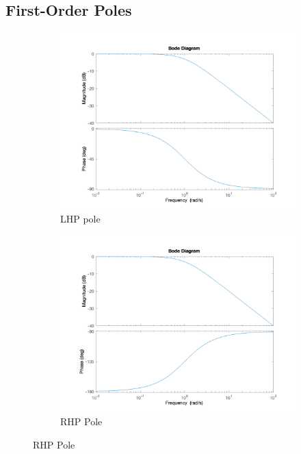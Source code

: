 \subsection*{First-Order Poles}
\begin{figure}[!h]
  \centering
  \begin{subfigure}[b]{0.45\textwidth}	
	\includegraphics[width=\textwidth]{Images/bode_lhp_pole}
	\caption{LHP pole}
	\label{fig:bode-lhp-pole}
  \end{subfigure}
  \begin{subfigure}[b]{0.45\textwidth}	
	\includegraphics[width=\textwidth]{Images/bode_rhp_pole}
	\caption{RHP Pole}
	\label{fig:bode-rhp-pole}
  \end{subfigure}
\end{figure}
